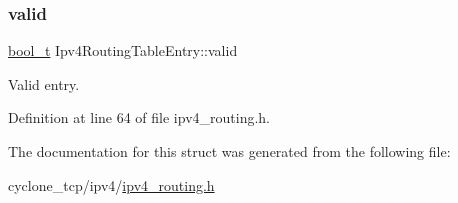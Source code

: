 \subsubsection{\texorpdfstring{valid}{valid}}
{\footnotesize\ttfamily \hyperlink{compiler__port_8h_a812d16e5494522586b3784e55d479912}{bool\+\_\+t} Ipv4\+Routing\+Table\+Entry\+::valid}



Valid entry. 



Definition at line 64 of file ipv4\+\_\+routing.\+h.



The documentation for this struct was generated from the following file\+:\begin{DoxyCompactItemize}
\item 
cyclone\+\_\+tcp/ipv4/\hyperlink{ipv4__routing_8h}{ipv4\+\_\+routing.\+h}\end{DoxyCompactItemize}
